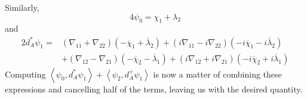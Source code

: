 \documentclass[twoside]{amsart}
\newcommand{\enm}[1]{\ensuremath{#1}}
\newcommand{\ip}[2]{\enm{\left<#1,#2\right>}}
\renewcommand{\bar}[1]{\overline{#1}}
\newcommand{\dievencov}[2]{\enm{\nabla_{#1\dot{#2}}}}
\newcommand{\cbi}[1]{\enm{\bar{\chi}_{\dot{#1}}}}
\newcommand{\lbi}[1]{\enm{\bar{\lambda}_{\dot{#1}}}}
\begin{document}
Similarly,
\[ 4\psi_{0} = \chi_{1}+\lambda_{2} \]
and
\[ \begin{split}
2d_{A}^{*}\psi_{1} = & (\dievencov{1}{1}+\dievencov{2}{2})
                      (-\cbi{1} + \lbi{2})+
                      (i\dievencov{1}{1}-i\dievencov{2}{2})
                      (-i\cbi{1} - i\lbi{2}) \\
                    & + (\dievencov{1}{2}-\dievencov{2}{1})
                      (-\cbi{2} - \lbi{1}) +
                      (i\dievencov{1}{2}+i\dievencov{2}{1})
                      (-i\cbi{2} + i\lbi{1})
\end{split}
\]
Computing \( \ip{\psi_{0}}{d_{A}^{*}\psi_{1}} +
\ip{\psi_{2}}{d_{A}^{+}\psi_{1}} \) is now a matter of combining
these expressions and cancelling half of the terms, leaving us with
the desired quantity.
\end{document}
